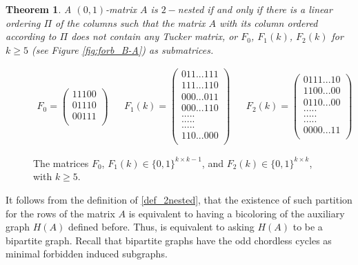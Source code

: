 \documentclass[a4paper,10pt]{report}
\theoremstyle{plain}
\newtheorem{teo}{Theorem}[chapter]
\theoremstyle{remark}
\theoremstyle{plain}
\begin{document}
\begin{teo}
	A $(0,1)$-matrix $A$ is $2-$nested if and only if there is a linear ordering $\Pi$ of the columns such that the matrix $A$ with its column ordered according to $\Pi$ does not contain any Tucker matrix, or $F_0$, $F_1(k)$, $F_2(k)$ for $k \geq 5$ (see Figure \ref{fig:forb_B-A}) as submatrices.
\end{teo}

\begin{figure}[h!]
	\centering
	\begin{align*}
			F_0= \begin{pmatrix}
				11100\\
				01110\\
				00111\\
			\end{pmatrix}
			&&
			F_1(k)= \begin{pmatrix}
				011...111\\
				111...110\\
				000...011\\
				000...110\\
				.   .   .   .   . \\
				.   .   .   .   . \\
				.   .   .   .   . \\
				110...000\\
			\end{pmatrix}
			&&
			F_2(k)= \begin{pmatrix}
				0111...10\\
				1100...00\\
				0110...00\\
				.   .   .   .   . \\
				.   .   .   .   . \\
				.   .   .   .   . \\
				0000...11\\
			\end{pmatrix}
	\end{align*}
	\caption{The matrices $F_0$, $F_1(k) \in \{0,1\}^{k \times k-1}$, and $F_2(k) \in \{0,1\}^{k \times k}$, with $k \geq 5$.}
\end{figure}\label{fig:forb_B-A}

It follows from the definition of \ref{def_2nested}, that the existence of such partition for the rows of the matrix $A$ is equivalent to having a bicoloring of the auxiliary graph $H(A)$ defined before. Thus, is equivalent to asking $H(A)$ to be a bipartite graph. 
Recall that bipartite graphs have the odd chordless cycles as minimal forbidden induced subgraphs.
\end{document}
